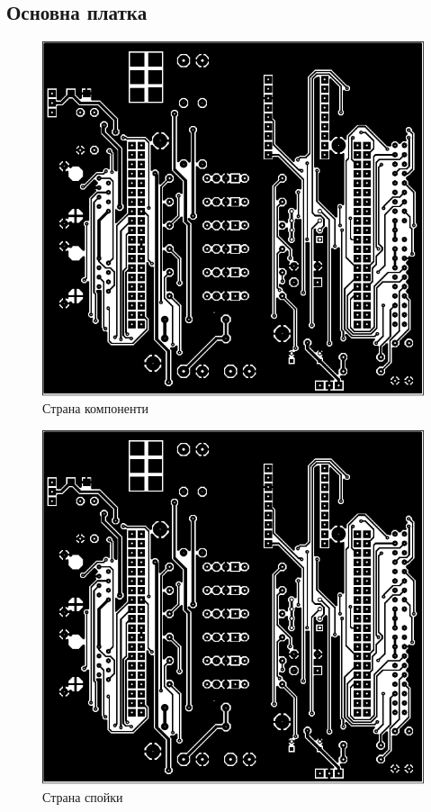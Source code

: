 \subsection{Основна платка}
\begin{figure}[!htbp]
    \centering
    \includegraphics[page=1]{documents/main_board.pdf}
    \caption{Страна компоненти}
    \label{fig:main_top}
\end{figure}
\begin{figure}[!htbp]
    \centering
    \includegraphics[page=2]{documents/main_board.pdf}
    \caption{Страна спойки}
    \label{fig:main_bot}
\end{figure}
